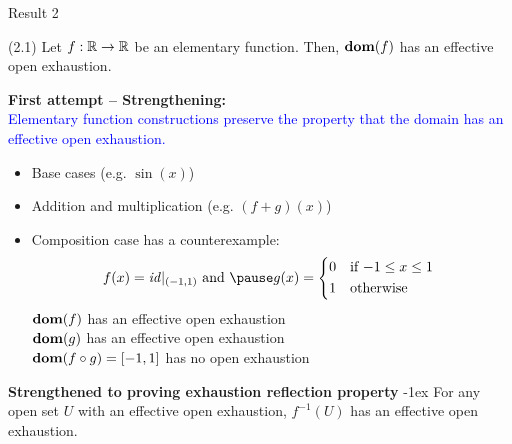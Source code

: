 \begin{frame}{Result 2 }
    \vspace{-1.5em}
    \begin{ntheorem}(2.1)
        Let $f:\mathbb{R}\to\mathbb{R}$ be an elementary function. Then, $\mathbf{dom}(f)$ has an effective open exhaustion.
    \end{ntheorem}
    \pause
    \vspace{-2em}
    \begin{minipage}[t]{0.52\linewidth}
        \begin{exampleblock}{\textbf{\textcolor{Mahogany}{First attempt --  Strengthening:}}\\ \textcolor{Blue}{Elementary function constructions preserve
        the property that the domain has an effective open exhaustion.}}
            \begin{itemize}
            \setlength\itemsep{-2pt}
                \pause\item Base cases \Checkmark (e.g. $\sin(x)$)
                \pause\item Addition and multiplication \Checkmark (e.g. $(f+g)(x)$) 
                \pause \item Composition case has a counterexample:
                \pause \[ f(x) = \mathit{id}|_{(-1,1)}\text{ and } \pause  g(x) = 
                        \begin{cases*}
                            0 & if $-1\leq x \leq 1$ \\
                            1 & otherwise
                        \end{cases*}
                \]
                \pause$\mathbf{dom}(f)$ has an effective open exhaustion \Checkmark\\
                \pause$\mathbf{dom}(g)$ has an effective open exhaustion \Checkmark\\
                \pause$\mathbf{dom}(f\circ g) = [-1,1]$ has no open exhaustion \textcolor{Mahogany}{\XSolidBrush}
            \end{itemize}
        \end{exampleblock}
    \end{minipage}
    \hspace{1em}
    \pause
    \begin{minipage}[t]{0.44\linewidth}
        \begin{exampleblock}{\textbf{\textcolor{BrickRed}{Strengthened to proving \textbf{exhaustion reflection property}}}}
            \kern-1ex
            For any open set $U$ with an effective open exhaustion, $f^{-1}(U)$ has an effective open exhaustion.\\

\end{exampleblock}
\end{minipage}
\end{frame}
